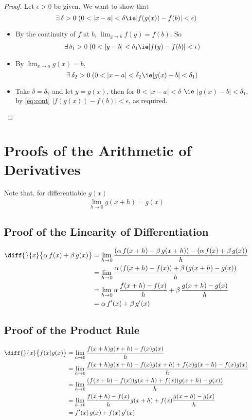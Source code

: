 \begin{proof}
  Let $\epsilon > 0$ be given. We want to show that
    $$\exists\,\delta > 0\;(0 < |x - a| < \delta \ie |f(g(x)) - f(b)| < \epsilon)$$
  \begin{itemize}
    \item By the continuity of $f$ at $b$, $\lim_{y\to b}f(y) = f(b)$. So
      \begin{align}
        \exists\,\delta_1 > 0\;(0 < |y - b| < \delta_1 \ie |f(y) - f(b)| < \epsilon)
      \end{align}
    \item By $\lim_{x\to a}g(x) = b$, $$\exists\,\delta_2 > 0\;(0 < |x - a| < \delta_2 \ie |g(x) - b| < \delta_1)$$
    \item Take $\delta = \delta_2$ and let $y = g(x)$, then for $ 0 < |x - a| < \delta$ $\ie$ $|g(x) - b| < \delta_1$, by \eqref{eq:cont} $|f(g(x)) - f(b)| < \epsilon$, as required.
  \end{itemize}
\end{proof}

\section{Proofs of the Arithmetic of Derivatives}
Note that, for differentiable $g(x)$
\begin{align*}
  \lim_{h\to 0}g(x + h) = g(x)
\end{align*}
\subsection*{Proof of the Linearity of Differentiation}
\begin{align*}
  \diff{}{x} \big\{\alpha\,f(x) + \beta\,g(x)\big\} &= \lim_{h\to 0}\frac{(\alpha\,f(x+h) + \beta\,g(x+h)) - (\alpha\,f(x) + \beta\,g(x))}{h} \\
  &=\lim_{h\to 0}\frac{\alpha\,(f(x+h) - f(x)) + \beta\,(g(x+h)-g(x))}{h} \\
  &=\lim_{h\to 0}\alpha\,\frac{f(x+h) - f(x)}{h} + \beta\,\frac{g(x+h)-g(x)}{h} \\
  &= \alpha\,f'(x) + \beta\,g'(x)
\end{align*}
\subsection*{Proof of the Product Rule}
\begin{align*}
  \diff{}{x} \big\{f(x)g(x)\big\} &= \lim_{h\to 0}\frac{f(x+h)g(x+h) - f(x)g(x)}{h} \\
  &=\lim_{h\to 0}\frac{f(x+h)g(x+h) - f(x)g(x+h) + f(x)g(x+h) - f(x)g(x)}{h} \\
  &=\lim_{h\to 0}\frac{(f(x+h)- f(x))g(x+h) + f(x)(g(x+h) - g(x))}{h} \\
  &=\lim_{h\to 0}\frac{f(x+h)- f(x)}{h}g(x+h) + f(x)\frac{g(x+h) - g(x)}{h} \\
  &= f'(x)\, g(x) + f(x)\,g'(x)
\end{align*}
